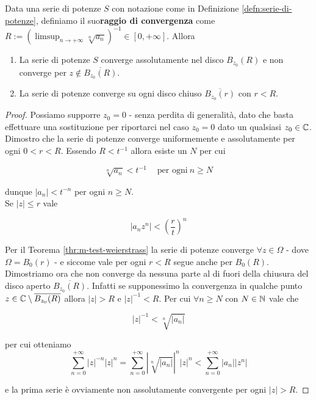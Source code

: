 \begin{theorem}
	\label{thr:criterio-hadamard}
	Data una serie di potenze $S$ con notazione come in Definizione \ref{defn:serie-di-potenze}, definiamo il suo\textbf{raggio di convergenza} come $R := ( \limsup_{n\to+\infty} \sqrt[n]{a_n})^{-1} \in \left[0,+\infty\right]$. Allora 
	\begin{enumerate}
		\item La serie di potenze $S$ converge assolutamente nel disco $B_{z_0}(R)$ e non converge per $z \notin \overline{B_{z_0}(R)}$.
		\item La serie di potenze converge su ogni disco chiuso $\overline{B_{z_0}(r)}$ con $r < R$.  
	\end{enumerate}
\end{theorem}
\begin{proof}
	Possiamo supporre $z_0 = 0$ - senza perdita di generalità, dato che basta effettuare una sostituzione per riportarci nel caso $z_0 = 0$ dato un qualsiasi $z_0 \in \mathbb{C}$.\\ 
	Dimostro che la serie di potenze converge uniformemente e assolutamente per ogni $0 < r < R$. Essendo $R < t^{-1}$ allora esiste un $N$ per cui
	
		\begin{equation*}
		\sqrt[n]{a_n} < t^{-1} \quad\ \text{per ogni}\ n \ge N 
		\end{equation*}
	
	dunque $|a_n| < t^{-n}$ per ogni $n \ge N$. \\ Se $|z| \le r$ vale
	
	\begin{equation*}
	|a_nz^n| < \left(\frac{r}{t}\right)^n
	\end{equation*}
	
	Per il Teorema \ref{thr:m-test-weierstrass} la serie di potenze converge $\forall z \in \Omega$ - dove $\Omega = B_0(r)$ - e siccome vale per ogni $r < R$ segue anche per $B_0(R)$.\\
	
	Dimostriamo ora che non converge da nessuna parte al di fuori della chiusura del disco aperto $\overline{B_{z_0}(R)}$. Infatti se supponessimo la convergenza in qualche punto $z \in \mathbb{C} \setminus \overline{B_{z_0}(R)}$ allora $|z| > R$ e $|z|^{-1} < R$. Per cui $\forall n \ge N$ con $N \in \mathbb{N}$ vale che
	
		\begin{equation*}
		|z|^{-1} < \sqrt[n]{|a_n|}
		\end{equation*}
		
	per cui otteniamo 
	\begin{equation*}	
	\sum^{+\infty}_{n=0}|z|^{-n}|z|^n = \sum^{+\infty}_{n=0}|\sqrt[n]{|a_n|}|^n|z|^n < \sum^{+\infty}_{n=0}|a_n||z^n| 
	\end{equation*}
	
	e la prima serie è ovviamente non assolutamente convergente per ogni $|z| > R$.
\end{proof}

